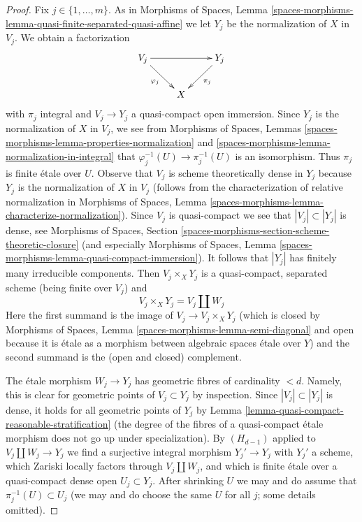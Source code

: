 \documentclass{stacks-project}
\theoremstyle{plain}
\theoremstyle{definition}
\theoremstyle{remark}
\numberwithin{equation}{subsection}
\begin{document}
\begin{proof}
\medskip\noindent
Fix $j \in \{1, \ldots, m\}$.
As in Morphisms of Spaces, Lemma
\ref{spaces-morphisms-lemma-quasi-finite-separated-quasi-affine}
we let $Y_j$ be the normalization of $X$ in $V_j$. We obtain a factorization
$$
\xymatrix{
V_j \ar[rr] \ar[rd]_{\varphi_j} & & Y_j \ar[ld]^{\pi_j} \\
& X
}
$$
with $\pi_j$ integral and $V_j \to Y_j$ a quasi-compact open immersion. Since
$Y_j$ is the normalization of $X$ in $V_j$, we see from
Morphisms of Spaces, Lemmas
\ref{spaces-morphisms-lemma-properties-normalization} and
\ref{spaces-morphisms-lemma-normalization-in-integral}
that $\varphi_j^{-1}(U) \to \pi_j^{-1}(U)$ is an isomorphism.
Thus $\pi_j$ is finite \'etale over $U$. Observe that $V_j$
is scheme theoretically dense in $Y_j$ because $Y_j$ is the normalization
of $X$ in $V_j$ (follows from the characterization of relative normalization
in Morphisms of Spaces, Lemma
\ref{spaces-morphisms-lemma-characterize-normalization}). Since $V_j$
is quasi-compact we see that $|V_j| \subset |Y_j|$ is dense,
see Morphisms of Spaces, Section
\ref{spaces-morphisms-section-scheme-theoretic-closure}
(and especially Morphisms of Spaces, Lemma
\ref{spaces-morphisms-lemma-quasi-compact-immersion}).
It follows that $|Y_j|$ has finitely many irreducible components.
Then $V_j \times_X Y_j$ is a quasi-compact, separated scheme
(being finite over $V_j$) and
$$
V_j \times_X Y_j = V_j \amalg W_j
$$
Here the first summand is the image of $V_j \to V_j \times_X Y_j$
(which is closed by
Morphisms of Spaces, Lemma \ref{spaces-morphisms-lemma-semi-diagonal}
and open because it is \'etale as a morphism between
algebraic spaces \'etale over $Y$) and
the second summand is the (open and closed) complement.

\medskip\noindent
The \'etale morphism $W_j \to Y_j$ has geometric fibres of cardinality $< d$.
Namely, this is clear for geometric points of $V_j \subset Y_j$ by inspection.
Since $|V_j| \subset |Y_j|$ is dense, it holds for all geometric points
of $Y_j$ by Lemma \ref{lemma-quasi-compact-reasonable-stratification}
(the degree of the fibres of a quasi-compact \'etale morphism
does not go up under specialization). By $(H_{d - 1})$ applied
to $V_j \amalg W_j \to Y_j$ we find a surjective integral morphism
$Y_j' \to Y_j$ with $Y_j'$ a scheme, which Zariski locally factors
through $V_j \amalg W_j$, and which is finite \'etale over a
quasi-compact dense open $U_j \subset Y_j$. After shrinking $U$
we may and do assume that $\pi_j^{-1}(U) \subset U_j$
(we may and do choose the same $U$ for all $j$; some details omitted).


\end{proof}
\end{document}
